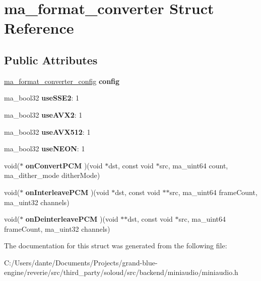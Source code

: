 \hypertarget{structma__format__converter}{}\section{ma\+\_\+format\+\_\+converter Struct Reference}
\label{structma__format__converter}
\subsection*{Public Attributes}
\begin{DoxyCompactItemize}
\item 
\mbox{\label{structma__format__converter_a08f0c493e9f0a42ba1bf1c1329b21d60}} 
\mbox{\hyperlink{structma__format__converter__config}{ma\+\_\+format\+\_\+converter\+\_\+config}} {\bfseries config}
\item 
\mbox{\label{structma__format__converter_afde82fcafddb89fcadf8ae23d7042f21}} 
ma\+\_\+bool32 {\bfseries use\+S\+S\+E2}\+: 1
\item 
\mbox{\label{structma__format__converter_a1e50101ded1257c02758a0f7408749eb}} 
ma\+\_\+bool32 {\bfseries use\+A\+V\+X2}\+: 1
\item 
\mbox{\label{structma__format__converter_ad3e94b00688092b37412044053a279d7}} 
ma\+\_\+bool32 {\bfseries use\+A\+V\+X512}\+: 1
\item 
\mbox{\label{structma__format__converter_aa703b4d29491ae9ba78b614563f1207b}} 
ma\+\_\+bool32 {\bfseries use\+N\+E\+ON}\+: 1
\item 
\mbox{\label{structma__format__converter_afac49ef6b7f336f59bfb8ff24e95750b}} 
void($\ast$ {\bfseries on\+Convert\+P\+CM} )(void $\ast$dst, const void $\ast$src, ma\+\_\+uint64 count, ma\+\_\+dither\+\_\+mode dither\+Mode)
\item 
\mbox{\label{structma__format__converter_a7b2444a11c6c4b97a17f5a450368a6ba}} 
void($\ast$ {\bfseries on\+Interleave\+P\+CM} )(void $\ast$dst, const void $\ast$$\ast$src, ma\+\_\+uint64 frame\+Count, ma\+\_\+uint32 channels)
\item 
\mbox{\label{structma__format__converter_ad0d6feafc3f75f728bff9030471e581b}} 
void($\ast$ {\bfseries on\+Deinterleave\+P\+CM} )(void $\ast$$\ast$dst, const void $\ast$src, ma\+\_\+uint64 frame\+Count, ma\+\_\+uint32 channels)
\end{DoxyCompactItemize}


The documentation for this struct was generated from the following file\+:\begin{DoxyCompactItemize}
\item 
C\+:/\+Users/dante/\+Documents/\+Projects/grand-\/blue-\/engine/reverie/src/third\+\_\+party/soloud/src/backend/miniaudio/miniaudio.\+h\end{DoxyCompactItemize}
